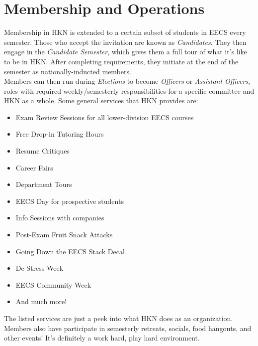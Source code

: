 \documentclass[11pt, article, oneside]{memoir}
\begin{document}
    \section{Membership and Operations}
    \label{sec:membership-and-operations}
        Membership in HKN is extended to a certain subset of students in EECS every semester.
        Those who accept the invitation are known as \emph{Candidates}.
        They then engage in the \emph{Candidate Semester}, which gives them a full tour of what it's like to be in HKN.
        After completing requirements, they initiate at the end of the semester as nationally-inducted members. \\

        Members can then run during \emph{Elections} to become \emph{Officers} or \emph{Assistant Officers}, roles with required weekly/semesterly responsibilities for a specific committee and HKN as a whole.
        Some general services that HKN provides are:
        \begin{itemize}
            \item Exam Review Sessions for all lower-division EECS courses
            \item Free Drop-in Tutoring Hours
            \item Resume Critiques
            \item Career Fairs
            \item Department Tours
            \item EECS Day for prospective students
            \item Info Sessions with companies
            \item Post-Exam Fruit Snack Attacks
            \item Going Down the EECS Stack Decal
            \item De-Stress Week
            \item EECS Community Week
            \item And much more!
        \end{itemize}
        The listed services are just a peek into what HKN does as an organization.
        Members also have participate in semesterly retreats, socials, food hangouts, and other events!
        It's definitely a work hard, play hard environment.

\end{document}
